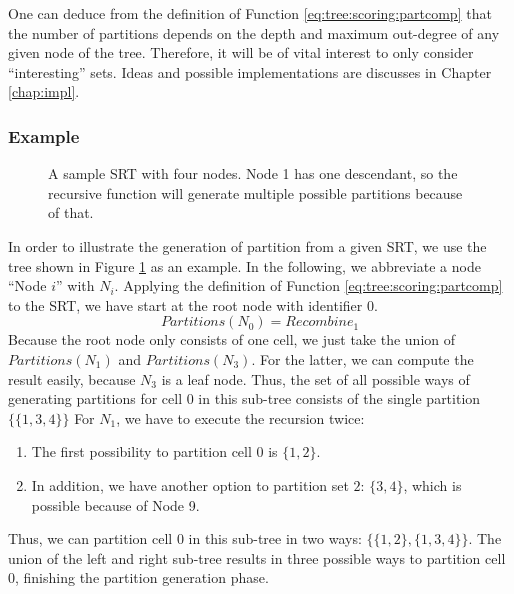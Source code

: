 		One can deduce from the definition of Function \ref{eq:tree:scoring:partcomp} that the number of partitions depends on the depth and maximum out-degree of any given node of the tree.
		Therefore, it will be of vital interest to only consider \enquote{interesting} sets.
		Ideas and possible implementations are discusses in Chapter \ref{chap:impl}.

		\clearpage

		\subsubsection{Example}

			\begin{figure}[ht!]
				\centering
				
				\caption{A sample \ac{SRT} with four nodes. Node 1 has one descendant, so the recursive function will generate multiple possible partitions because of that.}
				\label{fig:tree:scoring:example}
			\end{figure}

			In order to illustrate the generation of partition from a given \ac{SRT}, we use the tree shown in Figure \ref{fig:tree:scoring:example} as an example.
			In the following, we abbreviate a node \enquote{Node $i$} with $N_i$.
			Applying the definition of Function \ref{eq:tree:scoring:partcomp} to the \ac{SRT}, we have start at the root node with identifier 0.
			\begin{equation*}
				Partitions(N_0) = {Recombine}_1
			\end{equation*}
			Because the root node only consists of one cell, we just take the union of $Partitions(N_1)$ and $Partitions(N_3)$.
			For the latter, we can compute the result easily, because $N_3$ is a leaf node. Thus, the set of all possible ways of generating partitions for cell 0 in this sub-tree consists of the single partition $\{ \{ 1, 3, 4 \} \}$
			For $N_1$, we have to execute the recursion twice:

			\begin{enumerate}
				\item The first possibility to partition cell 0 is $\{ 1, 2 \}$.
				\item In addition, we have another option to partition set $2$: $\{ 3, 4 \}$, which is possible because of Node 9.
			\end{enumerate}

			Thus, we can partition cell 0 in this sub-tree in two ways: $\{ \{ 1, 2 \}, \{ 1, 3, 4 \} \}$.
			The union of the left and right sub-tree results in three possible ways to partition cell 0, finishing the partition generation phase.

